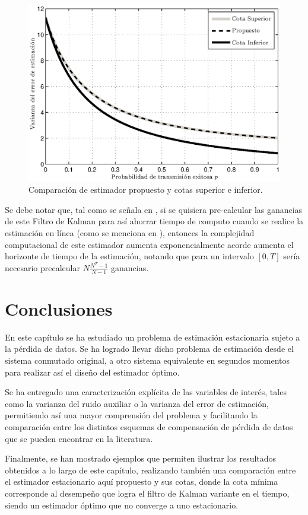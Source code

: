 \begin{figure}[htbp]
\centering
\includegraphics[scale=0.6]{./figuras/opt_kf.eps}
\caption{Comparaci\'on de estimador propuesto y cotas superior e inferior.}
\label{fig:kf}
\end{figure}

Se debe notar que, tal como se se\~nala en \cite{cofrma05,ji1990jump}, si se quisiera pre-calcular las ganancias de este Filtro de Kalman para as\'i ahorrar tiempo de computo cuando se realice la estimaci\'on en l\'inea (como se menciona en \cite{chung1976minimum}), entonces la complejidad computacional de este estimador aumenta exponencialmente acorde aumenta el horizonte de tiempo de la estimaci\'on, notando que para un intervalo $[0,T]$ ser\'ia necesario precalcular $N\frac{N^T-1}{N-1}$ ganancias.

\newpage
\section{Conclusiones}
En este cap\'itulo se ha estudiado un problema de estimaci\'on estacionaria sujeto a la p\'erdida de datos. Se ha logrado llevar dicho problema de estimaci\'on desde el sistema conmutado original, a otro sistema equivalente en segundos momentos para realizar as\'i el dise\~no del estimador \'optimo.

Se ha entregado una caracterizaci\'on expl\'icita de las variables de inter\'es, tales como la varianza del ruido auxiliar o la varianza del error de estimaci\'on, permitiendo as\'i una mayor comprensi\'on del problema y facilitando la comparaci\'on entre los distintos esquemas de compensaci\'on de p\'erdida de datos que se pueden encontrar en la literatura.

Finalmente, se han mostrado ejemplos que permiten ilustrar los resultados obtenidos a lo largo de este cap\'itulo, realizando tambi\'en una comparaci\'on entre el estimador estacionario aqu\'i propuesto y sus cotas, donde la  cota m\'inima corresponde al desempeño que logra el filtro de Kalman variante en el tiempo, siendo un estimador \'optimo que no converge a uno estacionario.